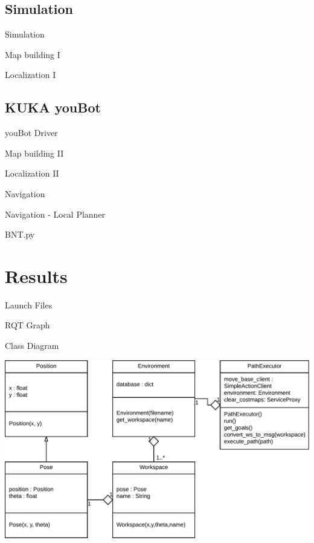 \documentclass[10pt,aspectratio=43,xcolor={usenames,dvipsnames,table}]{beamer}
\begin{document}
\subsection{Simulation}
\begin{frame}{Simulation}
\end{frame}
\begin{frame}{Map building I}
\end{frame}
\begin{frame}{Localization I}
\end{frame}
\subsection{KUKA youBot}
\begin{frame}{youBot Driver}
\end{frame}
\begin{frame}{Map building II}
\end{frame}
\begin{frame}{Localization II}
\end{frame}
\begin{frame}{Navigation}
\end{frame}
\begin{frame}{Navigation - Local Planner}
\end{frame}
\begin{frame}{BNT.py}
\end{frame}

\section{Results}
\begin{frame}{Launch Files}
\end{frame}
\begin{frame}{RQT Graph}
\end{frame}

\begin{frame}{Class Diagram}
    \begin{center}
        \includegraphics[width=\linewidth,height=0.9\textheight,keepaspectratio]{gfx/01.pdf}
    \end{center}
\end{frame}
\end{document}
